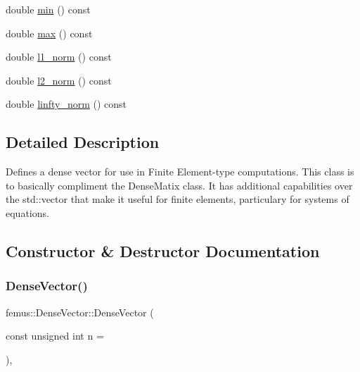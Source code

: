 \begin{DoxyCompactItemize}
double \mbox{\hyperlink{classfemus_1_1_dense_vector_afddbf21de9804dc92c2c0e2d217731fa}{min}} () const
\item 
double \mbox{\hyperlink{classfemus_1_1_dense_vector_a622888ea147eebeeb784feec0774ad22}{max}} () const
\item 
double \mbox{\hyperlink{classfemus_1_1_dense_vector_ab9de4dc64cde6d40e82c279e164598ff}{l1\+\_\+norm}} () const
\item 
double \mbox{\hyperlink{classfemus_1_1_dense_vector_a01f73192a11d56115e0afa3c3212be36}{l2\+\_\+norm}} () const
\item 
double \mbox{\hyperlink{classfemus_1_1_dense_vector_a036328ba679553324981f7014bbc2500}{linfty\+\_\+norm}} () const
\end{DoxyCompactItemize}


\subsection{Detailed Description}
Defines a dense vector for use in Finite Element-\/type computations. This class is to basically compliment the {\ttfamily Dense\+Matix} class. It has additional capabilities over the {\ttfamily std\+::vector} that make it useful for finite elements, particulary for systems of equations. 

\subsection{Constructor \& Destructor Documentation}
\mbox{\label{classfemus_1_1_dense_vector_a9ea4283bc84797b07197c41b6796f03c}} 
\subsubsection{\texorpdfstring{Dense\+Vector()}{DenseVector()}\hspace{0.1cm}{\footnotesize\ttfamily [1/3]}}
{\footnotesize\ttfamily femus\+::\+Dense\+Vector\+::\+Dense\+Vector (\begin{DoxyParamCaption}\item[{const unsigned int}]{n = {} }\end{DoxyParamCaption})\hspace{0.3cm}{\ttfamily [inline]}, {\ttfamily [explicit]}}



